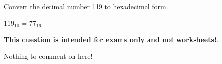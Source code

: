 

Convert the decimal number 119 to hexadecimal form.







119$_{10}$ = 77$_{16}$







{\bf This question is intended for exams only and not worksheets!}.

Nothing to comment on here!




